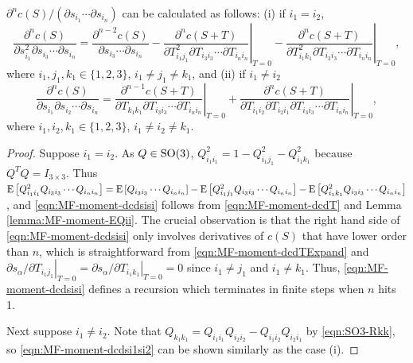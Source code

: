 \begin{theorem} \label{thm:MF-moment-dcds}
	$\partial^n c(S) / (\partial s_{i_1} \cdots \partial s_{i_n})$ can be calculated as follows: (i) if $i_1 = i_2$,
	\begin{equation} \label{eqn:MF-moment-dcdsisi}
		\frac{\partial^n c(S)}{\partial s_{i_1}^2 \partial s_{i_3} \cdots \partial s_{i_n}} = \frac{\partial^{n-2} c(S)}{\partial s_{i_3} \cdots \partial s_{i_n}} - \left. \frac{\partial^n c(S+T)}{\partial T_{i_1j_1}^2 \partial T_{i_3i_3} \cdots \partial T_{i_ni_n}} \right|_{T=0} - \left. \frac{\partial^n c(S+T)}{\partial T_{i_1k_1}^2 \partial T_{i_3i_3} \cdots \partial T_{i_ni_n}} \right|_{T=0},
	\end{equation}
	where $i_1,j_1,k_1 \in \{1,2,3\}$, $i_1 \neq j_1 \neq k_1$, and (ii) if $i_1 \neq i_2$
	\begin{equation}\label{eqn:MF-moment-dcdsi1si2}
		\frac{\partial^n c(S)}{\partial s_{i_1} \partial s_{i_2} \cdots \partial s_{i_n}} = \left. \frac{\partial^{n-1} c(S+T)}{\partial T_{k_1k_1} \partial T_{i_3i_3} \cdots \partial T_{i_ni_n}} \right|_{T=0} + \left. \frac{\partial^n c(S+T)}{\partial T_{i_1i_2} \partial T_{i_2i_1} \partial T_{i_3i_3} \cdots \partial T_{i_ni_n}} \right|_{T=0},
	\end{equation}
	where $i_1,i_2,k_1 \in \{1,2,3\}$, $i_1\neq i_2\neq k_1$.
\end{theorem}
\begin{proof}
	Suppose $i_1=i_2$. 
	As $Q\in\mathrm{SO}(3)$, $Q_{i_1i_1}^2 = 1 - Q_{i_1j_1}^2 - Q_{i_1k_1}^2$ because $Q^TQ=I_{3\times 3}$.
	Thus $\mathrm{E}\left[ Q_{i_1i_1}^2Q_{i_3i_3} \cdots Q_{i_ni_n} \right] = \mathrm{E}\left[ Q_{i_3i_3} \cdots Q_{i_ni_n} \right] - \mathrm{E}\left[ Q_{i_1j_1}^2Q_{i_3i_3} \cdots Q_{i_ni_n} \right] - \mathrm{E}\left[ Q_{i_1k_1}^2Q_{i_3i_3} \cdots Q_{i_ni_n} \right]$, and \eqref{eqn:MF-moment-dcdsisi} follows from \eqref{eqn:MF-moment-dcdT} and Lemma \ref{lemma:MF-moment-EQii}.
	The crucial observation is that the right hand side of \eqref{eqn:MF-moment-dcdsisi} only involves derivatives of $c(S)$ that have lower order than $n$, which is straightforward from \eqref{eqn:MF-moment-dcdTExpand} and $\left.\partial s_\alpha / \partial T_{i_1j_1}\right|_{T=0} = \left.\partial s_\alpha / \partial T_{i_1k_1}\right|_{T=0} = 0$ since $i_1 \neq j_1$ and $i_1 \neq k_1$.
	Thus, \eqref{eqn:MF-moment-dcdsisi} defines a recursion which terminates in finite steps when $n$ hits 1.
	
	Next suppose $i_1\neq i_2$.
	Note that $Q_{k_1k_1} = Q_{i_1i_1}Q_{i_2i_2}-Q_{i_1i_2}Q_{i_2i_1}$ by \eqref{eqn:SO3-Rkk}, so \eqref{eqn:MF-moment-dcdsi1si2} can be shown similarly as the case (i).
\end{proof}

